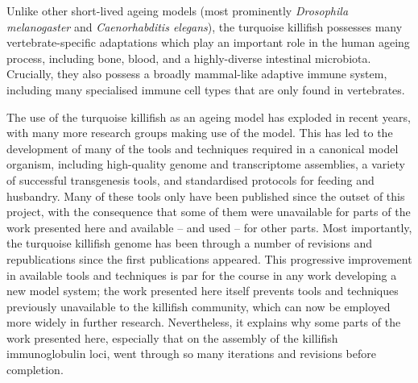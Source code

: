Unlike other short-lived ageing models (most prominently \textit{Drosophila melanogaster} and \textit{Caenorhabditis elegans}), the turquoise killifish possesses many vertebrate-specific adaptations which play an important role in the human ageing process, including bone, blood, and a highly-diverse intestinal microbiota. Crucially, they also possess a broadly mammal-like adaptive immune system, including many specialised immune cell types that are only found in vertebrates.

The use of the turquoise killifish as an ageing model has exploded in recent years, with many more research groups making use of the model. This has led to the development of many of the tools and techniques required in a canonical model organism, including high-quality genome and transcriptome assemblies, a variety of successful transgenesis tools, and standardised protocols for feeding and husbandry. Many of these tools only have been published since the outset of this project, with the consequence that some of them were unavailable for parts of the work presented here and available -- and used -- for other parts. Most importantly, the turquoise killifish genome has been through a number of revisions and republications since the first publications appeared. This progressive improvement in available tools and techniques is par for the course in any work developing a new model system; the work presented here itself prevents tools and techniques previously unavailable to the killifish community, which can now be employed more widely in further research. Nevertheless, it explains why some parts of the work presented here, especially that on the assembly of the killifish immunoglobulin loci, went through so many iterations and revisions before completion.

